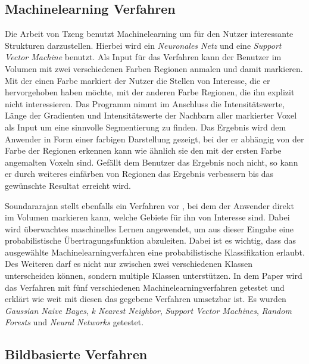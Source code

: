 \subsection{Machinelearning Verfahren}

Die Arbeit von Tzeng \cite{tzeng2005intelligent} benutzt Machinelearning um für den Nutzer interessante Strukturen darzustellen. Hierbei wird ein \textit{Neuronales Netz} und eine \textit{Support Vector Machine} benutzt.
\newline
Als Input für das Verfahren kann der Benutzer im Volumen mit zwei verschiedenen Farben Regionen anmalen und damit markieren. Mit der einen Farbe markiert der Nutzer die Stellen von Interesse, die er hervorgehoben haben möchte, mit der anderen Farbe Regionen, die ihn explizit nicht interessieren. Das Programm nimmt im Anschluss die Intensitätswerte, Länge der Gradienten und Intensitätswerte der Nachbarn aller markierter Voxel als Input um eine sinnvolle Segmentierung zu finden.
\newline
Das Ergebnis wird dem Anwender in Form einer farbigen Darstellung gezeigt, bei der er abhängig von der Farbe der Regionen erkennen kann wie ähnlich sie den mit der ersten Farbe angemalten Voxeln sind. Gefällt dem Benutzer das Ergebnis noch nicht, so kann er durch weiteres einfärben von Regionen das Ergebnis verbessern bis das gewünschte Resultat erreicht wird.


Soundararajan stellt ebenfalls ein Verfahren vor \cite{soundararajan2015learning}, bei dem der Anwender direkt im Volumen markieren kann, welche Gebiete für ihn von Interesse sind.
\newline
Dabei wird überwachtes maschinelles Lernen angewendet, um aus dieser Eingabe eine probabilistische Übertragungsfunktion abzuleiten. Dabei ist es wichtig, dass das ausgewählte Machinelearningverfahren eine probabilistische Klassifikation erlaubt. Des Weiteren darf es nicht nur zwischen zwei verschiedenen Klassen unterscheiden können, sondern multiple Klassen unterstützen.
\newline
In dem Paper wird das Verfahren mit fünf verschiedenen Machinelearningverfahren getestet und erklärt wie weit mit diesen das gegebene Verfahren umsetzbar ist. Es wurden \textit{Gaussian Naive Bayes}, \textit{k Nearest Neighbor}, \textit{Support Vector Machines}, \textit{Random Forests} und \textit{Neural Networks} getestet.



\subsection{Bildbasierte Verfahren}

